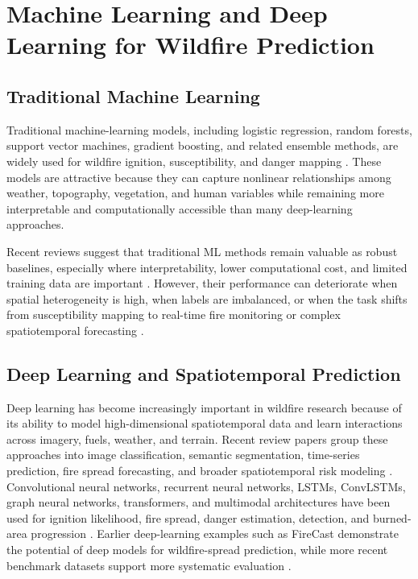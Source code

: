 \section{Machine Learning and Deep Learning for Wildfire Prediction}

\subsection{Traditional Machine Learning}

Traditional machine-learning models, including logistic regression, random forests, support vector machines, gradient boosting, and related ensemble methods, are widely used for wildfire ignition, susceptibility, and danger mapping \citep{jain2020review,sayad2019predictive,liu2025advancements,xu2024survey,jodhani2026ai,ejaz2025mlpipeline}. These models are attractive because they can capture nonlinear relationships among weather, topography, vegetation, and human variables while remaining more interpretable and computationally accessible than many deep-learning approaches.

Recent reviews suggest that traditional ML methods remain valuable as robust baselines, especially where interpretability, lower computational cost, and limited training data are important \citep{jain2020review,jodhani2026ai,liu2025advancements,ejaz2025mlpipeline}. However, their performance can deteriorate when spatial heterogeneity is high, when labels are imbalanced, or when the task shifts from susceptibility mapping to real-time fire monitoring or complex spatiotemporal forecasting \citep{caron2025ai}.

\subsection{Deep Learning and Spatiotemporal Prediction}

Deep learning has become increasingly important in wildfire research because of its ability to model high-dimensional spatiotemporal data and learn interactions across imagery, fuels, weather, and terrain. Recent review papers group these approaches into image classification, semantic segmentation, time-series prediction, fire spread forecasting, and broader spatiotemporal risk modeling \citep{xu2024survey,xu2025deeplearning,ejaz2025mlpipeline}. Convolutional neural networks, recurrent neural networks, LSTMs, ConvLSTMs, graph neural networks, transformers, and multimodal architectures have been used for ignition likelihood, fire spread, danger estimation, detection, and burned-area progression \citep{liu2025advancements,xu2025deeplearning}. Earlier deep-learning examples such as FireCast demonstrate the potential of deep models for wildfire-spread prediction, while more recent benchmark datasets support more systematic evaluation \citep{radke2019firecast,huot2022nextday}.

